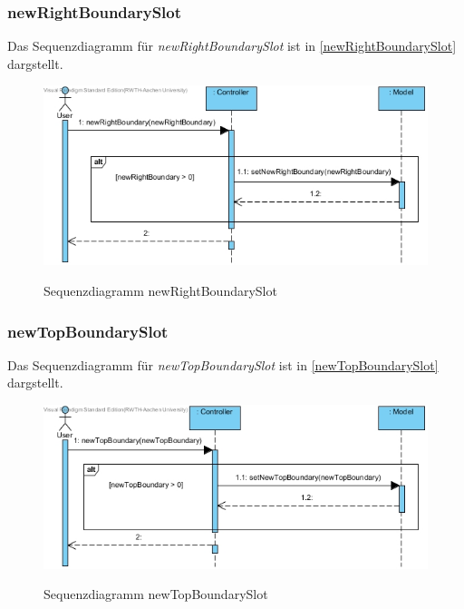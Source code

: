 \subsubsection*{newRightBoundarySlot}

Das Sequenzdiagramm für \emph{newRightBoundarySlot} ist in \ref{newRightBoundarySlot} dargstellt.

\begin{figure}[H]
	\centering
	\includegraphics[scale=.6]{Bilder/Controller__newRightBoundarySlot().jpg}\\
	\caption{Sequenzdiagramm newRightBoundarySlot}
	\label{Sequenzdiagramm newRightBoundarySlot}
\end{figure}

\subsubsection*{newTopBoundarySlot}

Das Sequenzdiagramm für \emph{newTopBoundarySlot} ist in \ref{newTopBoundarySlot} dargstellt.

\begin{figure}[H]
	\centering
	\includegraphics[scale=.6]{Bilder/Controller__newTopBoundarySlot().jpg}\\
	\caption{Sequenzdiagramm newTopBoundarySlot}
	\label{Sequenzdiagramm newTopBoundarySlot}
\end{figure}

